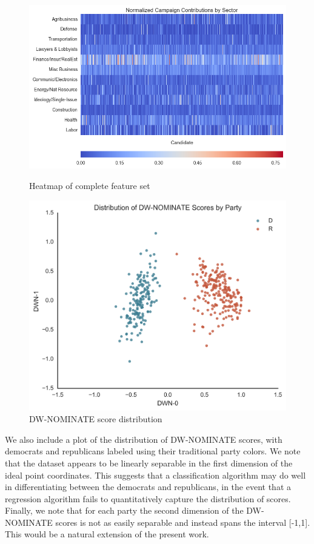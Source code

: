 \documentclass[12]{article}
\begin{document}
\begin{figure}[!tbp]
  \centering
  \begin{minipage}[b]{0.5\textwidth}
    \includegraphics[width=\textwidth]{cand_2010_2012_2014_fm_trim_normed_feature_hm.png}
    \caption{\label{fig:feature_heatmap}Heatmap of complete feature set}
  \end{minipage}
  \hfill
  \begin{minipage}[b]{0.4\textwidth}
    \includegraphics[width=\textwidth]{dwn.png}
    \caption{\label{fig:dwn}DW-NOMINATE score distribution}
  \end{minipage}
\end{figure}

We also include a plot of the distribution of DW-NOMINATE scores, with democrats and republicans labeled using their traditional party colors. We note that the dataset appears to be linearly separable in the first dimension of the ideal point coordinates. This suggests that a classification algorithm may do well in differentiating between the democrats and republicans, in the event that a regression algorithm fails to quantitatively capture the distribution of scores. Finally, we note that for each party the second dimension of the DW-NOMINATE scores is not as easily separable and instead spans the interval [-1,1]. This would be a natural extension of the present work.
\end{document}
